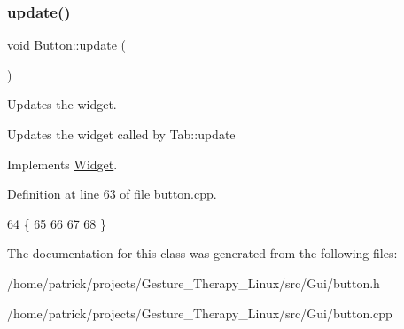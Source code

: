 \subsubsection{\texorpdfstring{update()}{update()}}
{\footnotesize\ttfamily void Button\+::update (\begin{DoxyParamCaption}{ }\end{DoxyParamCaption})\hspace{0.3cm}{\ttfamily [virtual]}}



Updates the widget. 

Updates the widget called by Tab\+::update 

Implements \hyperlink{class_widget_a726dc97add2c6eb82967144207280ace}{Widget}.



Definition at line 63 of file button.\+cpp.


\begin{DoxyCode}
64 \{
65     
66     
67     
68 \}
\end{DoxyCode}


The documentation for this class was generated from the following files\+:\begin{DoxyCompactItemize}
\item 
/home/patrick/projects/\+Gesture\+\_\+\+Therapy\+\_\+\+Linux/src/\+Gui/button.\+h\item 
/home/patrick/projects/\+Gesture\+\_\+\+Therapy\+\_\+\+Linux/src/\+Gui/button.\+cpp\end{DoxyCompactItemize}
